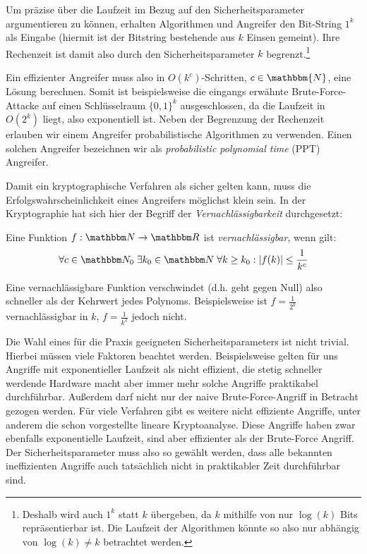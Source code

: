 Um präzise über die Laufzeit im Bezug auf den Sicherheitsparameter argumentieren zu können, erhalten Algorithmen und Angreifer den Bit-String $1^k$ als Eingabe (hiermit ist der Bitstring bestehende aus $k$ Einsen gemeint). Ihre Rechenzeit ist damit also durch den Sicherheitsparameter $k$ begrenzt.\footnote{Deshalb wird auch $1^k$ statt $k$ übergeben, da $k$ mithilfe von nur $\log(k)$ Bits repräsentierbar ist. Die Laufzeit der Algorithmen könnte so also nur abhängig von $\log(k) \neq k$ betrachtet werden.} 

Ein effizienter Angreifer muss also in $O(k^c)$-Schritten, $c \in \mathbbm{N}$, eine Lösung berechnen. Somit ist beispielsweise die eingangs erwähnte Brute-Force-Attacke auf einen Schlüsselraum $\{0, 1\}^{k}$ ausgeschlossen, da die Laufzeit in $O(2^{k})$ liegt, also exponentiell ist.
Neben der Begrenzung der Rechenzeit erlauben wir einem Angreifer probabilistische Algorithmen zu verwenden. Einen solchen Angreifer bezeichnen wir als \emph{probabilistic polynomial time} (PPT) Angreifer.

Damit ein kryptographische Verfahren als sicher gelten kann, muss die Erfolgswahrscheinlichkeit eines Angreifers möglichst \glqq klein\grqq{} sein. In der Kryptographie hat sich hier der Begriff der \emph{Vernachlässigbarkeit} durchgesetzt:
\begin{definition}[Vernachlässigbarkeit]
	Eine Funktion $f: \N \to \R$ ist \emph{vernachlässigbar}, wenn gilt:
	\begin{align*}
	\forall c \in \N_0 \; \exists k_0 \in \N \; \forall k \geq k_0 : \vert f(k) \vert \leq \frac{1}{k^c} 
	\end{align*}
\end{definition}
Eine vernachlässigbare Funktion \glqq verschwindet\grqq{} (d.h. geht gegen Null) also schneller als der Kehrwert jedes Polynoms. Beispielsweise ist $f = \frac{1}{2^k}$ vernachlässigbar in $k$, $f = \frac{1}{k^2}$ jedoch nicht.

Die Wahl eines für die Praxis geeigneten Sicherheitsparameters ist nicht trivial. Hierbei müssen viele Faktoren beachtet werden. Beispielsweise gelten für uns Angriffe mit exponentieller Laufzeit als nicht effizient, die stetig schneller werdende Hardware macht aber immer mehr solche Angriffe praktikabel durchführbar.
Außerdem darf nicht nur der naive Brute-Force-Angriff in Betracht gezogen werden. Für viele Verfahren gibt es weitere nicht effiziente Angriffe, unter anderem die schon vorgestellte lineare Kryptoanalyse. Diese Angriffe haben zwar ebenfalls exponentielle Laufzeit, sind aber effizienter als der Brute-Force Angriff. Der Sicherheitsparameter muss also so gewählt werden, dass alle bekannten ineffizienten Angriffe auch tatsächlich nicht in praktikabler Zeit durchführbar sind. 

